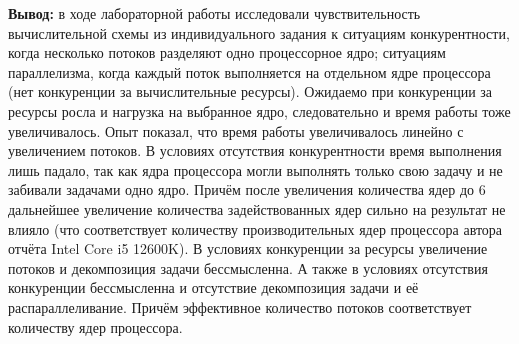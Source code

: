 \documentclass[a4paper,14pt]{extarticle}
\begin{document}
\textbf{Вывод: } в ходе лабораторной работы исследовали чувствительность вычислительной схемы из индивидуального задания 
к ситуациям конкурентности, когда несколько потоков разделяют одно процессорное ядро; 
ситуациям параллелизма, когда каждый поток выполняется на отдельном ядре процессора
(нет конкуренции за вычислительные ресурсы). Ожидаемо при конкуренции за ресурсы росла и нагрузка на выбранное ядро, 
следовательно и время работы тоже увеличивалось. Опыт показал, что время работы увеличивалось линейно с 
увеличением потоков. В условиях отсутствия конкурентности время выполнения лишь падало, так как ядра процессора
могли выполнять только свою задачу и не забивали задачами одно ядро. Причём после увеличения количества ядер до 6
дальнейшее увеличение количества задействованных ядер сильно на результат не влияло (что соответствует
количеству производительных ядер процессора автора отчёта Intel Core i5 12600K). В условиях конкуренции за 
ресурсы увеличение потоков и декомпозиция задачи бессмысленна. А также в условиях отсутствия конкуренции 
бессмысленна и отсутствие декомпозиция задачи и её распараллеливание. Причём эффективное количество потоков 
соответствует количеству ядер процессора.
\end{document}
